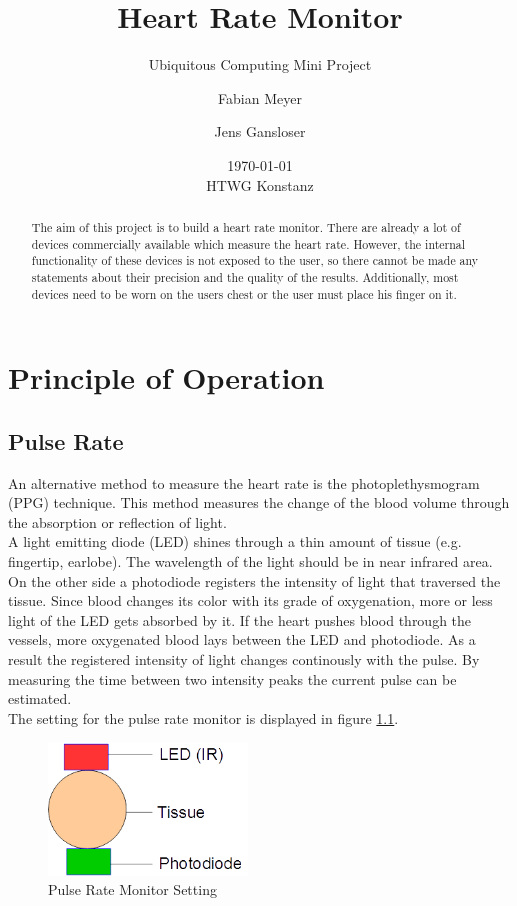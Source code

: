 \documentclass[fontsize=12pt,toc=bibliography, notitlepage]{scrreprt}
\title{Heart Rate Monitor}
\subtitle{Ubiquitous Computing Mini Project}
\author{Fabian Meyer \and Jens Gansloser}
\date{\today \\ HTWG Konstanz}
\begin{document}
\maketitle
\begin{abstract}
The aim of this project is to build a heart rate monitor. There are already a lot of devices commercially available which measure the heart rate. However, the internal functionality of these devices is not exposed to the user, so there cannot be made any statements about their precision and the quality of the results. Additionally, most devices need to be worn on the users chest or the user must place his finger on it.
\end{abstract}
\clearpage

\tableofcontents

\chapter{Principle of Operation}
\label{chap:principle-of-operation}

\section{Pulse Rate}
\label{sec:pulse-rate}
An alternative method to measure the heart rate is the photoplethysmogram (PPG) technique. This method measures the change of the blood volume through the absorption or reflection of light.\\
A light emitting diode (LED) shines through a thin amount of tissue (e.g. fingertip, earlobe). The wavelength of the light should be in near infrared area. On the other side a photodiode registers the intensity of light that traversed the tissue. Since blood changes its color with its grade of oxygenation, more or less light of the LED gets absorbed by it. If the heart pushes blood through the vessels, more oxygenated blood lays between the LED and photodiode. As a result the registered intensity of light changes continously with the pulse. By measuring the time between two intensity peaks the current pulse can be estimated.\\
The setting for the pulse rate monitor is displayed in figure \ref{fig:pulse-rate-monitor-setting}.

\begin{figure}[H]
	\centering
	\includegraphics[width=200px]{images/pulse-rate-aufbau.png}
	\caption{Pulse Rate Monitor Setting}
	\label{fig:pulse-rate-monitor-setting}
\end{figure}
\end{document}

